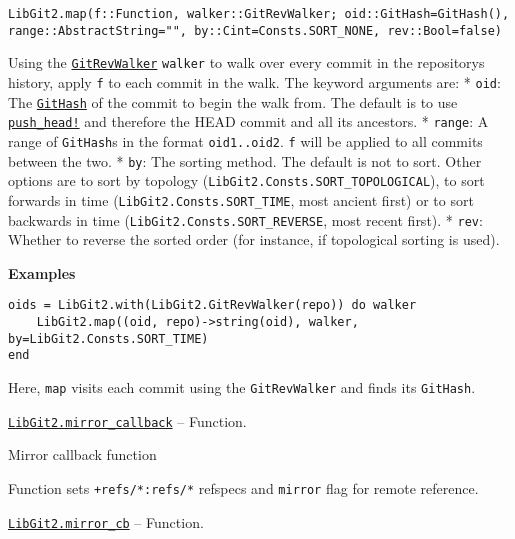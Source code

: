 \begin{adjustwidth}{2em}{0pt}


\begin{verbatim}
LibGit2.map(f::Function, walker::GitRevWalker; oid::GitHash=GitHash(), range::AbstractString="", by::Cint=Consts.SORT_NONE, rev::Bool=false)
\end{verbatim}

Using the \hyperlink{7800294839307043628}{\texttt{GitRevWalker}} \texttt{walker} to {\textquotedbl}walk{\textquotedbl} over every commit in the repository{\textquotesingle}s history, apply \texttt{f} to each commit in the walk. The keyword arguments are:     * \texttt{oid}: The \hyperlink{202290709580230708}{\texttt{GitHash}} of the commit to begin the walk from. The default is to use       \hyperlink{9792433728015067335}{\texttt{push\_head!}} and therefore the HEAD commit and all its ancestors.     * \texttt{range}: A range of \texttt{GitHash}s in the format \texttt{oid1..oid2}. \texttt{f} will be       applied to all commits between the two.     * \texttt{by}: The sorting method. The default is not to sort. Other options are to sort by       topology (\texttt{LibGit2.Consts.SORT\_TOPOLOGICAL}), to sort forwards in time       (\texttt{LibGit2.Consts.SORT\_TIME}, most ancient first) or to sort backwards in time       (\texttt{LibGit2.Consts.SORT\_REVERSE}, most recent first).     * \texttt{rev}: Whether to reverse the sorted order (for instance, if topological sorting is used).

\textbf{Examples}


\begin{verbatim}
oids = LibGit2.with(LibGit2.GitRevWalker(repo)) do walker
    LibGit2.map((oid, repo)->string(oid), walker, by=LibGit2.Consts.SORT_TIME)
end
\end{verbatim}

Here, \texttt{map} visits each commit using the \texttt{GitRevWalker} and finds its \texttt{GitHash}.



\end{adjustwidth}
\hypertarget{3649636619945218341}{} 
\hyperlink{3649636619945218341}{\texttt{LibGit2.mirror\_callback}}  -- {Function.}

\begin{adjustwidth}{2em}{0pt}

Mirror callback function

Function sets \texttt{+refs/*:refs/*} refspecs and \texttt{mirror} flag for remote reference.



\end{adjustwidth}
\hypertarget{381062800465562522}{} 
\hyperlink{381062800465562522}{\texttt{LibGit2.mirror\_cb}}  -- {Function.}

